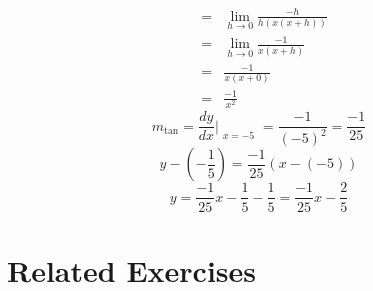 \documentclass{article}
\begin{document}
\begin{enumerate}
\begin{eqnarray}
                      &=& \lim_{h \to 0}{\frac{-h}{h(x(x + h))}} \\
                      &=& \lim_{h \to 0}{\frac{-1}{x(x + h)}} \\
                      &=& \frac{-1}{x(x + 0)} \\
                      &=& \frac{-1}{x^2}
    \end{eqnarray}
    $$m_{\tan} = \frac{dy}{dx}\Bigr|_{\substack{x=-5}} = \frac{-1}{(-5)^2} = \frac{-1}{25}$$
    $$y - (- \frac{1}{5}) = \frac{-1}{25}(x - (-5))$$
    $$y = \frac{-1}{25}x - \frac{1}{5} - \frac{1}{5} = \frac{-1}{25}x - \frac{2}{5}$$
\end{enumerate}

\section*{Related Exercises}
\end{document}
